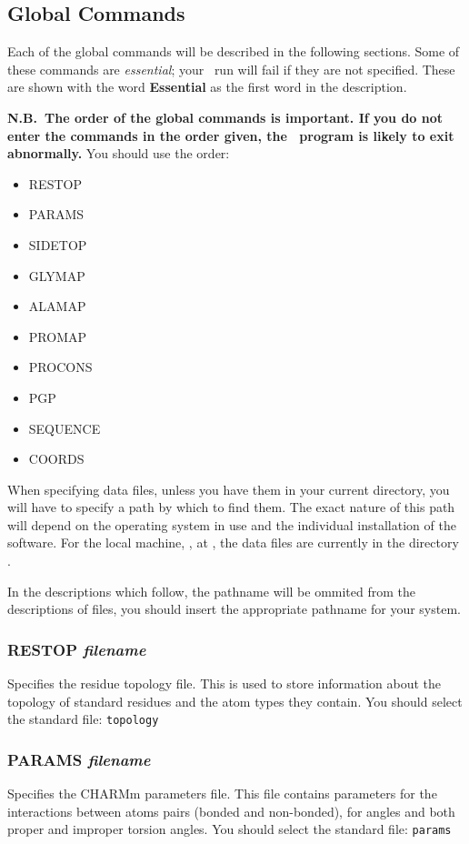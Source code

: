 \subsection{Global Commands}
Each of the global commands will be described in the following sections.
Some of these commands are {\em essential}; your \cs\ run will fail if they
are not specified. These are shown with the word {\bf Essential} as the 
first word in the description.

{\bf N.B.~The order of the global commands is important. If you do not
enter the commands in the order given, the \cs\ program is likely to exit
abnormally.} You should use the order:
\begin{itemize}
\item RESTOP
\item PARAMS
\item SIDETOP
\item GLYMAP
\item ALAMAP
\item PROMAP
\item PROCONS
\item PGP
\item SEQUENCE
\item COORDS
\end{itemize}

When specifying data files, unless you have them in your current directory,
you will have to specify a path by which to find them. The exact nature
of this path will depend on the operating system in use and the individual
installation of the software. For the local machine, \localmachine, at
\site, the data files are currently in the directory \localdat.

In the descriptions which follow, the pathname will be ommited from the
descriptions of files, you should insert the appropriate pathname for
your system.

\subsubsection{RESTOP {\em filename}}
\es
Specifies the residue topology file. This is used to store information
about the topology of standard residues and the atom types they contain.
You should select the standard file: {\tt topology}

\subsubsection{PARAMS {\em filename}}
\es
Specifies the CHARMm parameters file. This file contains parameters for
the interactions between atoms pairs (bonded and non-bonded), for
angles and both proper and improper torsion angles. You should select the
standard file: {\tt params}

